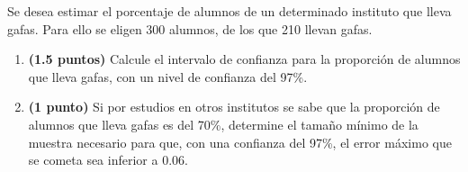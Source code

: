 
Se desea estimar el porcentaje de alumnos de un determinado instituto que lleva gafas. Para ello se eligen 300 alumnos, de los que 210 llevan gafas.
\begin{enumerate}[label=\alph*)]
\item \textbf{(1.5 puntos)} Calcule el intervalo de confianza para la proporción de alumnos que lleva gafas, con un nivel de confianza del 97\%.
\item \textbf{(1 punto)} Si por estudios en otros institutos se sabe que la proporción de alumnos que lleva gafas es del 70\%, determine el tamaño mínimo de la muestra necesario para que, con una confianza del 97\%, el error máximo que se cometa sea inferior a $0.06$.
\end{enumerate}
